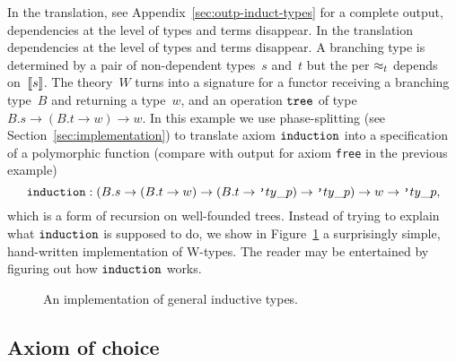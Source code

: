 \iflong
In the translation, see Appendix~\ref{sec:outp-induct-types} for a
complete output, dependencies at the level of types and terms disappear.
\else
In the translation dependencies at the level of types and terms disappear.
\fi
%
A branching type is determined by a pair of non-dependent types~$s$
and~$t$ but the per $\approx_t$ depends on~$[\![s]\!]$. The theory~$W$
turns into a signature for a functor receiving a branching type~$B$
and returning a type~$w$, and an operation $\mathtt{tree}$ of type
$B.s \to (B.t \to w) \to w$. In this example we use phase-splitting
(see Section~\ref{sec:implementation}) to translate axiom
$\mathtt{induction}$ into a specification of a polymorphic function
(compare with output for axiom \texttt{free} in the previous example)
%
\begin{equation*}
  \f{induction}:
  (B.s \to (B.t \to w) \to (B.t \to \poly{ty\_p}) \to \poly{ty\_p}) \to w \to \poly{ty\_p},
\end{equation*}
%
which is a form of recursion on well-founded trees. Instead of trying
to explain what $\mathtt{induction}$ is supposed to do, we show in
Figure~\ref{fig:wtype-implementation} a surprisingly simple,
hand-written implementation of W-types. The reader may be entertained
by figuring out how $\mathtt{induction}$ works.
%
\begin{figure}
  \centering
  \caption{An implementation of general inductive types.}
  \label{fig:wtype-implementation}
\end{figure}



\subsection{Axiom of choice}
\label{sec:axiom-choice}

